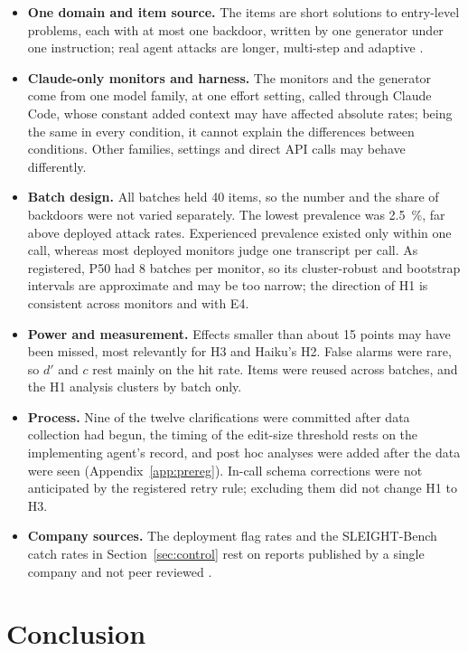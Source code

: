 \documentclass[manuscript, screen, review]{jair}
\begin{document}
\begin{itemize}
\item \textbf{One domain and item source.} The items are short solutions to entry-level problems, each with at most one backdoor, written by one generator under one instruction; real agent attacks are longer, multi-step and adaptive \parencite{kutasov2025,najt2026arxiv}.
\item \textbf{Claude-only monitors and harness.} The monitors and the generator come from one model family, at one effort setting, called through Claude Code, whose constant added context may have affected absolute rates; being the same in every condition, it cannot explain the differences between conditions. Other families, settings and direct API calls may behave differently.
\item \textbf{Batch design.} All batches held 40 items, so the number and the share of backdoors were not varied separately. The lowest prevalence was \SI{2.5}{\percent}, far above deployed attack rates. Experienced prevalence existed only within one call, whereas most deployed monitors judge one transcript per call. As registered, P50 had 8 batches per monitor, so its cluster-robust and bootstrap intervals are approximate and may be too narrow; the direction of H1 is consistent across monitors and with E4.
\item \textbf{Power and measurement.} Effects smaller than about 15 points may have been missed, most relevantly for H3 and Haiku's H2. False alarms were rare, so $d'$ and $c$ rest mainly on the hit rate. Items were reused across batches, and the H1 analysis clusters by batch only.
\item \textbf{Process.} Nine of the twelve clarifications were committed after data collection had begun, the timing of the edit-size threshold rests on the implementing agent's record, and post hoc analyses were added after the data were seen (Appendix~\ref{app:prereg}). In-call schema corrections were not anticipated by the registered retry rule; excluding them did not change H1 to H3.
\item \textbf{Company sources.} The deployment flag rates and the SLEIGHT-Bench catch rates in Section~\ref{sec:control} rest on reports published by a single company and not peer reviewed \parencite{favaro_pace,najt2026}.
\end{itemize}

\section{Conclusion}\label{sec:conclusion}
\end{document}
